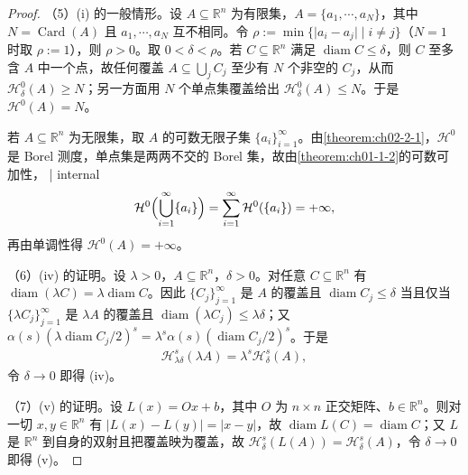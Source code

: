 \documentclass[../../main.tex]{subfiles}%
\begin{document}
\begin{proof}
（5）(i) 的一般情形。设 $A\subseteq\mathbb{R}^n$ 为有限集，$A=\{a_1,\cdots,a_N\}$，其中 $N=\operatorname{Card}(A)$ 且 $a_1,\cdots,a_N$ 互不相同。令 $\rho:=\min\{\lvert a_i-a_j\rvert\mid i\neq j\}$（$N=1$ 时取 $\rho:=1$），则 $\rho>0$。取 $0<\delta<\rho$。若 $C\subseteq\mathbb{R}^n$ 满足 $\operatorname{diam}C\leqslant\delta$，则 $C$ 至多含 $A$ 中一个点，故任何覆盖 $A\subseteq\bigcup_jC_j$ 至少有 $N$ 个非空的 $C_j$，从而 $\mathcal{H}^0_\delta(A)\geqslant N$；另一方面用 $N$ 个单点集覆盖给出 $\mathcal{H}^0_\delta(A)\leqslant N$。于是 $\mathcal{H}^0(A)=N$。

若 $A\subseteq\mathbb{R}^n$ 为无限集，取 $A$ 的可数无限子集 $\{a_i\}_{i=1}^{\infty}$。由\cref{theorem:ch02-2-1}，$\mathcal{H}^0$ 是 Borel 测度，单点集是两两不交的 Borel 集，故由\cref{theorem:ch01-1-2}的可数可加性， | internal %
\begin{align*}
\mathcal{H}^0\Bigl(\bigcup_{i=1}^{\infty}\{a_i\}\Bigr)=\sum_{i=1}^{\infty}\mathcal{H}^0(\{a_i\})=+\infty,
\end{align*}
再由单调性得 $\mathcal{H}^0(A)=+\infty$。

（6）(iv) 的证明。设 $\lambda>0$，$A\subseteq\mathbb{R}^n$，$\delta>0$。对任意 $C\subseteq\mathbb{R}^n$ 有 $\operatorname{diam}(\lambda C)=\lambda\operatorname{diam}C$。因此 $\{C_j\}_{j=1}^{\infty}$ 是 $A$ 的覆盖且 $\operatorname{diam}C_j\leqslant\delta$ 当且仅当 $\{\lambda C_j\}_{j=1}^{\infty}$ 是 $\lambda A$ 的覆盖且 $\operatorname{diam}(\lambda C_j)\leqslant\lambda\delta$；又 $\alpha(s)(\lambda\operatorname{diam}C_j/2)^s=\lambda^s\alpha(s)(\operatorname{diam}C_j/2)^s$。于是
\begin{align*}
\mathcal{H}^s_{\lambda\delta}(\lambda A)=\lambda^s\mathcal{H}^s_\delta(A),
\end{align*}
令 $\delta\to0$ 即得 (iv)。

（7）(v) 的证明。设 $L(x)=Ox+b$，其中 $O$ 为 $n\times n$ 正交矩阵、$b\in\mathbb{R}^n$。则对一切 $x,y\in\mathbb{R}^n$ 有 $\lvert L(x)-L(y)\rvert=\lvert x-y\rvert$，故 $\operatorname{diam}L(C)=\operatorname{diam}C$；又 $L$ 是 $\mathbb{R}^n$ 到自身的双射且把覆盖映为覆盖，故 $\mathcal{H}^s_\delta(L(A))=\mathcal{H}^s_\delta(A)$，令 $\delta\to0$ 即得 (v)。
\end{proof}
\end{document}
